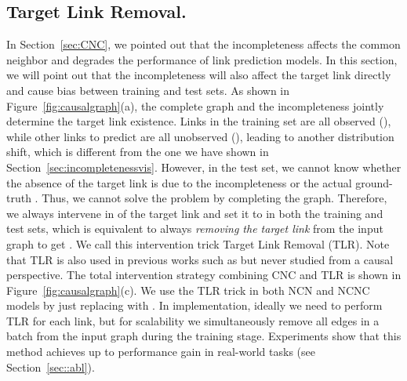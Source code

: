\documentclass{article}
\theoremstyle{plain}
\theoremstyle{definition}
\theoremstyle{remark}
\begin{document}
\subsection{Target Link Removal.}\label{sec:TLR}
In Section~\ref{sec:CNC}, we pointed out that the incompleteness  affects the common neighbor and degrades the performance of link prediction models. In this section, we will point out that the incompleteness will also affect the target link directly and cause bias between training and test sets. 
As shown in Figure~\ref{fig:causalgraph}(a), the complete graph and the incompleteness jointly determine the target link existence. Links in the training set are all observed (), while other links to predict are all unobserved (), leading to another distribution shift, which is different from the one we have shown in Section~\ref{sec:incompletenessvis}. However, in the test set, we cannot know whether the absence of the target link is due to the incompleteness  or the actual ground-truth . Thus, we cannot solve the problem by completing the graph. Therefore, we always intervene in  of the target link and set it to  in both the training and test sets, which is equivalent to always \textit{removing the target link}  from the input graph  to get . We call this intervention trick Target Link Removal (TLR). Note that TLR is also used in previous works such as \citet{SEAL} but never studied from a causal perspective. The total intervention strategy combining CNC and TLR is shown in Figure~\ref{fig:causalgraph}(c). We use the TLR trick in both NCN and NCNC models by just replacing  with .
In implementation, ideally we need to perform TLR for each link, but for scalability we simultaneously remove all edges in a batch from the input graph during the training stage. Experiments show that this method achieves up to  performance gain in real-world tasks (see Section~\ref{sec::abl}).
\end{document}
